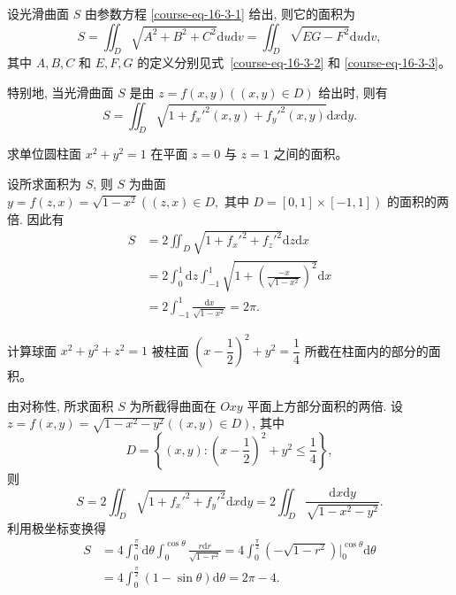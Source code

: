 \documentclass[UTF8,12pt,a4paper,fontset=fandol]{ctexart}
\begin{document}
\begin{theorem}\label{course-theorem-16-3-1}\quad 设光滑曲面 $S$ 由参数方程 \eqref{course-eq-16-3-1}  给出, 则它的面积为
\[
  S=\iint_D \sqrt{A^2+B^2+C^2}\mathrm du\mathrm dv
  =\iint_D \sqrt{EG-F^2}\mathrm du\mathrm dv,
\]
其中 $A,B,C$ 和 $E,F,G$ 的定义分别见式~\eqref{course-eq-16-3-2}  和 \eqref{course-eq-16-3-3}。

特别地, 当光滑曲面 $S$ 是由 $z=f(x,y)((x,y)\in D)$ 给出时, 则有
\[
  S=\iint_D \sqrt{1+f_x'^2(x,y)+f_y'^2(x,y)}\mathrm dx\mathrm dy.
\]

\end{theorem}
\begin{example}\label{course-example-16-3-1}\quad 求单位圆柱面 $x^2+y^2=1$ 在平面 $z=0$ 与 $z=1$ 之间的面积。

\end{example}
\begin{solve}\quad 设所求面积为 $S$, 则 $S$ 为曲面 $y=f(z,x)=\sqrt{1-x^2}((z,x)\in D,\text{ 其中 }D=[0,1]\times[-1,1])$ 的面积的两倍. 因此有
\[
\begin{aligned}
  S&=2\iint_D\sqrt{1+f_x'^2+f_z'^2}\mathrm dz\mathrm dx\\
  &=2\int_0^1\mathrm dz\int_{-1}^1\sqrt{1+\left(\frac{-x}{\sqrt{1-x^2}}\right)^2}\mathrm dx\\
  &=2\int_{-1}^1\frac{\mathrm dx}{\sqrt{1-x^2}}=2\pi.
\end{aligned}
\]

\end{solve}
\begin{example}\label{course-example-16-3-2}\quad 计算球面 $x^2+y^2+z^2=1$ 被柱面 $\left(x-\dfrac12\right)^2+y^2=\dfrac14$ 所截在柱面内的部分的面积。

\end{example}
\begin{solve}\quad 由对称性, 所求面积 $S$ 为所截得曲面在 $Oxy$ 平面上方部分面积的两倍. 设 $z=f(x,y)=\sqrt{1-x^2-y^2}((x,y)\in D)$, 其中
\[
  D=\left\{(x,y):\left(x-\frac12\right)^2+y^2\leqslant\frac14\right\},
\]
则
\[
  S=2\iint_D\sqrt{1+f_x'^2+f_y'^2}\mathrm dx\mathrm dy
  =2\iint_D\frac{\mathrm dx\mathrm dy}{\sqrt{1-x^2-y^2}}.
\]
利用极坐标变换得
\[
\begin{aligned}
  S&=4\int_0^{\frac\pi2}\mathrm d\theta\int_0^{\cos\theta}
  \frac{r\mathrm dr}{\sqrt{1-r^2}}
  =4\int_0^{\frac\pi2}\left(-\sqrt{1-r^2}\right)\bigg|_0^{\cos\theta}\mathrm d\theta\\
  &=4\int_0^{\frac\pi2}(1-\sin\theta)\mathrm d\theta=2\pi-4.
\end{aligned}
\]

\end{solve}
\end{document}
